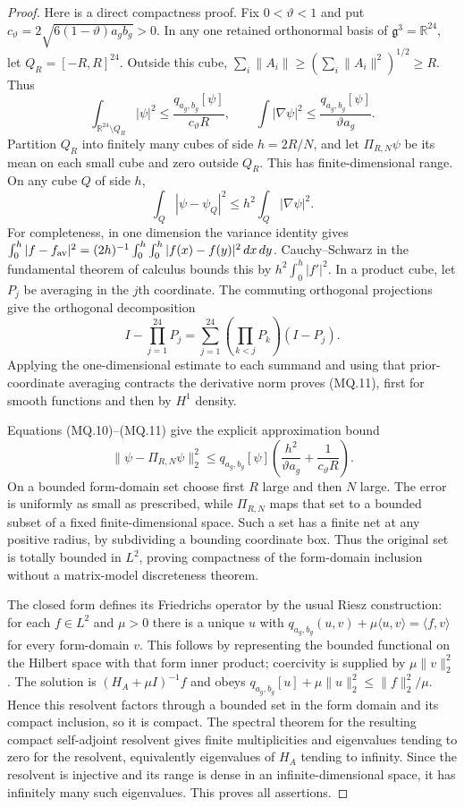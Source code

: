 \begin{proof}
Here is a direct compactness proof. Fix $0<\vartheta<1$ and put
$c_\vartheta=2\sqrt{6(1-\vartheta)a_gb_g}>0$.
In any one retained orthonormal basis of $\mathfrak g^3=\mathbb R^{24}$,
let $Q_R=[-R,R]^{24}$. Outside this cube,
$\sum_i\|A_i\|\geq(\sum_i\|A_i\|^2)^{1/2}\geq R$. Thus
\[
 \int_{\mathbb R^{24}\setminus Q_R}|\psi|^2
 \leq\frac{q_{a_g,b_g}[\psi]}{c_\vartheta R},\qquad
 \int|\nabla\psi|^2\leq\frac{q_{a_g,b_g}[\psi]}{\vartheta a_g}.
                                                               \tag{MQ.10}
\]
Partition $Q_R$ into finitely many cubes of side $h=2R/N$,
and let $\Pi_{R,N}\psi$ be its mean on each small cube and zero
outside $Q_R$. This has finite-dimensional range. On any cube
$Q$ of side $h$,
\[
 \int_Q|\psi-\psi_Q|^2\leq h^2\int_Q|\nabla\psi|^2.            \tag{MQ.11}
\]
For completeness, in one dimension the variance identity gives
$\int_0^h|f-f_{\rm av}|^2
=(2h)^{-1}\int_0^h\int_0^h|f(x)-f(y)|^2\,dx\,dy$.
Cauchy--Schwarz in the fundamental theorem of calculus bounds
this by $h^2\int_0^h|f'|^2$. In a product cube, let $P_j$
be averaging in the $j$th coordinate. The commuting orthogonal
projections give the orthogonal decomposition
\[
 I-\prod_{j=1}^{24}P_j
 =\sum_{j=1}^{24}\left(\prod_{k<j}P_k\right)(I-P_j).
 \]
Applying the one-dimensional estimate to each summand and using
that prior-coordinate averaging contracts the derivative norm
proves (MQ.11), first for smooth functions and then by $H^1$
density.

Equations (MQ.10)--(MQ.11) give the explicit approximation bound
\[
 \|\psi-\Pi_{R,N}\psi\|_2^2
 \leq q_{a_g,b_g}[\psi]
       \left(\frac{h^2}{\vartheta a_g}
                    +\frac1{c_\vartheta R}\right).           \tag{MQ.12}
\]
On a bounded form-domain set choose first $R$ large and then
$N$ large. The error is uniformly as small as prescribed,
while $\Pi_{R,N}$ maps that set to a bounded subset of a fixed
finite-dimensional space. Such a set has a finite net at any
positive radius, by subdividing a bounding coordinate box.
Thus the original set is totally bounded in $L^2$, proving
compactness of the form-domain inclusion without a matrix-model
discreteness theorem.

The closed form defines its Friedrichs operator by the usual
Riesz construction: for each $f\in L^2$ and $\mu>0$ there is a
unique $u$ with
$q_{a_g,b_g}(u,v)+\mu\langle u,v\rangle=\langle f,v\rangle$
for every form-domain $v$. This follows by representing the
bounded functional on the Hilbert space with that form inner
product; coercivity is supplied by $\mu\|v\|_2^2$.
The solution is $(H_A+\mu I)^{-1}f$ and obeys
$q_{a_g,b_g}[u]+\mu\|u\|_2^2\leq\|f\|_2^2/\mu$.
Hence this resolvent factors through a bounded set in the form
domain and its compact inclusion, so it is compact.
The spectral theorem for the resulting compact self-adjoint
resolvent gives finite multiplicities and eigenvalues tending
to zero for the resolvent, equivalently eigenvalues of $H_A$
tending to infinity. Since the resolvent is injective and its
range is dense in an infinite-dimensional space, it has
infinitely many such eigenvalues. This proves all assertions.
\end{proof}

